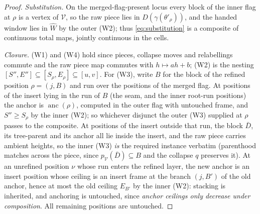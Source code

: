 \documentclass[12pt]{amsart}
\theoremstyle{definition}
\theoremstyle{remark}
\newcommand{\Cal}[1]{\mathcal{#1}}
\newcommand{\anc}{\operatorname{anc}}            %
\newcommand{\Dg}[1]{D(#1)}                       %
\begin{document}
\begin{proof}
\emph{Substitution.} On the merged-flag-present locus every block of the inner flag at $\rho$ is a vertex of $\Cal{V}$, so the raw piece lies in $\Dg{\gamma(\theta'_\rho)}$, and the handed window lies in $\widehat{W}$ by the outer (W2); thus \eqref{eq:substitution} is a composite of continuous total maps, jointly continuous in the cells.

\emph{Closure.} (W1) and (W4) hold since pieces, collapse moves and relabellings commute and the raw piece map commutes with $h\mapsto ah+b$; (W2) is the nesting $[S'',E'']\subseteq[S_\rho,E_\rho]\subseteq[u,v]$. For (W3), write $B$ for the block of the refined position $\rho=(j,B)$ and run over the positions of the merged flag. At positions of the insert lying in the run of $B$ (the seam, and the inner root-run positions) the anchor is $\anc(\rho)$, computed in the outer flag with untouched frame, and $S''\geq S_\rho$ by the inner (W2); so whichever disjunct the outer (W3) supplied at $\rho$ passes to the composite. At positions of the insert outside that run, the block $\bar D$, its tree-parent and its anchor all lie inside the insert, and the raw piece carries ambient heights, so the inner (W3) \emph{is} the required instance verbatim (parenthood matches across the piece, since $p_{\Cal{V}}(\bar D)\subseteq B$ and the collapse $q$ preserves it). At an unrefined position $\nu$ whose run enters the refined layer, the new anchor is an insert position whose ceiling is an insert frame at the branch $(j,B')$ of the old anchor, hence at most the old ceiling $E_{B'}$ by the inner (W2): stacking is inherited, and anchoring is untouched, since \emph{anchor ceilings only decrease under composition}. All remaining positions are untouched.


\end{proof}
\end{document}
